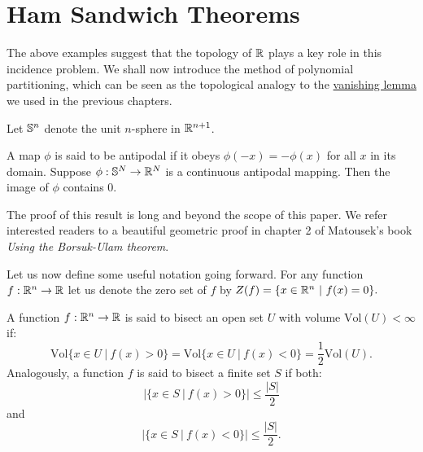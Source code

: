 \section{Ham Sandwich Theorems}
The above examples suggest that the topology of $\mathbb R$ plays a key role in this incidence problem. We shall now introduce the method of polynomial partitioning,
which can be seen as the topological analogy to the \hyperref[kaklem2]{vanishing lemma} we used in the previous chapters. 

Let $\mathbb S^n$ denote the unit $n$-sphere in $\mathbb R^{n+1}$. 
\begin{theorem}
    A map $\phi$ is said to be antipodal if it obeys $\phi (-x) = -\phi(x)$ for all $x$ in its domain. Suppose $\phi: \mathbb S^N \to \mathbb R^N$ is a continuous antipodal mapping. 
    Then the image of $\phi$ contains 0. 
    \label{thm:Borsuk-Ulam}
\end{theorem}
The proof of this result is long and beyond the scope of this paper. We refer interested readers to a beautiful geometric proof in chapter 2 of Matousek's book \textit{Using the Borsuk-Ulam theorem}.\cite{matouvsek2003using}

Let us now define some useful notation going forward. 
For any function $f : \mathbb R^n \to \mathbb R$ let us denote the zero set of $f$ by $Z(f) = \{x \in \mathbb R^n \ | \ f(x) = 0\}.$
\begin{definition}
A function $f :\mathbb R^n \to \mathbb R$ is said to bisect an open set $U$ with volume $\text{Vol}(U) < \infty$ if:
\[
    \text{Vol}\{x \in U \ | \ f(x) > 0 \} = \text{Vol}\{x \in U \ | \ f(x) < 0 \} = \frac{1}{2} \text{Vol}(U).
\]
Analogously, a function $f$ is said to bisect a finite set $S$ if both:
\[
  |\{x \in S \ | \ f(x) > 0\}| \leq \frac{|S|}{2}   
\]
and 
\[
  |\{x \in S \ | \ f(x) < 0\}| \leq \frac{|S|}{2}.
\]

\end{definition}



